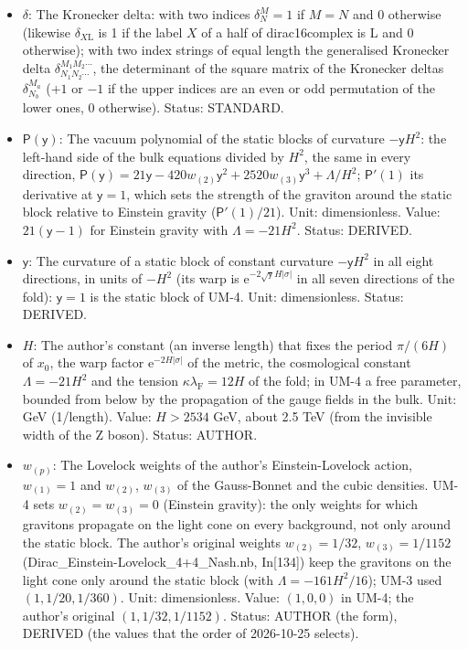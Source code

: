 \documentclass[
  10pt,
]{article}
\begin{document}
\begin{itemize}
  Status: AUTHOR (the term), DERIVED (the value).
\item
  \(\delta\): The Kronecker delta: with two indices \(\delta^M_N = 1\)
  if \(M = N\) and 0 otherwise (likewise \(\delta_{X\mathrm{L}}\) is 1
  if the label \(X\) of a half of dirac16complex is L and 0 otherwise);
  with two index strings of equal length the generalised Kronecker delta
  \(\delta^{M_1M_2\cdots}_{N_1N_2\cdots}\), the determinant of the
  square matrix of the Kronecker deltas \(\delta^{M_a}_{N_b}\) (\(+1\)
  or \(-1\) if the upper indices are an even or odd permutation of the
  lower ones, 0 otherwise). Status: STANDARD.
\item
  \(\mathsf{P}(\mathsf{y})\): The vacuum polynomial of the static blocks
  of curvature \(-\mathsf{y}H^2\): the left-hand side of the bulk
  equations divided by \(H^2\), the same in every direction,
  \(\mathsf{P}(\mathsf{y}) = 21\mathsf{y} - 420w_{(2)}\mathsf{y}^2 + 2520w_{(3)}\mathsf{y}^3 + \Lambda/H^2\);
  \(\mathsf{P}'(1)\) its derivative at \(\mathsf{y} = 1\), which sets
  the strength of the graviton around the static block relative to
  Einstein gravity (\(\mathsf{P}'(1)/21\)). Unit: dimensionless. Value:
  \(21(\mathsf{y} - 1)\) for Einstein gravity with \(\Lambda = -21H^2\).
  Status: DERIVED.
\item
  \(\mathsf{y}\): The curvature of a static block of constant curvature
  \(-\mathsf{y}H^2\) in all eight directions, in units of \(-H^2\) (its
  warp is \(\mathrm{e}^{-2\sqrt{\mathsf{y}}H\lvert\sigma\rvert}\) in all
  seven directions of the fold): \(\mathsf{y} = 1\) is the static block
  of UM-4. Unit: dimensionless. Status: DERIVED.
\item
  \(H\): The author's constant (an inverse length) that fixes the period
  \(\pi/(6H)\) of \(x_0\), the warp factor
  \(\mathrm{e}^{-2H\lvert\sigma\rvert}\) of the metric, the cosmological
  constant \(\Lambda = -21H^2\) and the tension
  \(\kappa\lambda_{\mathrm{F}} = 12H\) of the fold; in UM-4 a free
  parameter, bounded from below by the propagation of the gauge fields
  in the bulk. Unit: GeV (1/length). Value: \(H > 2534\) GeV, about 2.5
  TeV (from the invisible width of the Z boson). Status: AUTHOR.
\item
  \(w_{(p)}\): The Lovelock weights of the author's Einstein-Lovelock
  action, \(w_{(1)} = 1\) and \(w_{(2)}\), \(w_{(3)}\) of the
  Gauss-Bonnet and the cubic densities. UM-4 sets
  \(w_{(2)} = w_{(3)} = 0\) (Einstein gravity): the only weights for
  which gravitons propagate on the light cone on every background, not
  only around the static block. The author's original weights
  \(w_{(2)} = 1/32\), \(w_{(3)} = 1/1152\)
  (Dirac\_Einstein-Lovelock\_4+4\_Nash.nb, In{[}134{]}) keep the
  gravitons on the light cone only around the static block (with
  \(\Lambda = -161H^2/16\)); UM-3 used \((1, 1/20, 1/360)\). Unit:
  dimensionless. Value: \((1, 0, 0)\) in UM-4; the author's original
  \((1, 1/32, 1/1152)\). Status: AUTHOR (the form), DERIVED (the values
  that the order of 2026-10-25 selects).
\end{itemize}
\end{document}
